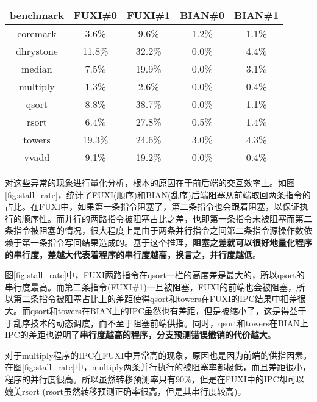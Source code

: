 \begin{table}[!htbp]
	\label{tab:stall_rate}
	\centering
	\footnotesize%
	\setlength{\tabcolsep}{4pt}%
	\renewcommand{\arraystretch}{1.2}%
	\begin{tabular}{ccccc}
		\hline
		benchmark   & FUXI\#0 & FUXI\#1 & BIAN\#0& BIAN\#1\\%
		\hline
		coremark    & 3.6\%  & 9.6\%  & 1.2\% & 1.1\% \\
		dhrystone   & 11.8\% & 32.2\% & 0.0\% & 4.4\% \\
		median 		& 7.5\%  & 19.9\% & 0.0\% & 3.1\% \\
		multiply 	& 1.3\%  & 2.6\%  & 0.0\% & 0.4\% \\
		qsort  		& 8.8\%  & 38.7\% & 0.0\% & 1.1\% \\
		rsort  		& 6.4\%  & 27.8\% & 0.5\% & 1.4\% \\
		towers 		& 19.3\% & 24.6\% & 3.0\% & 4.3\% \\
		vvadd 		& 9.1\%  & 19.2\% & 0.0\% & 0.4\% \\
		\hline
	\end{tabular}
\end{table}
	
对这些异常的现象进行量化分析，根本的原因在于前后端的交互效率上。如图\ref{fig:stall_rate}，统计了FUXI(顺序)和BIAN(乱序)后端阻塞从前端取回两条指令的占比。在FUXI中，如果第一条指令阻塞了，第二条指令也会跟着阻塞，以保证执行的顺序性。而并行的两路指令被阻塞占比之差，也即第一条指令未被阻塞而第二条指令被阻塞的情况，很大程度上是由于两条并行指令之间第二条指令源操作数依赖于第一条指令写回结果造成的。基于这个推理，\textbf{阻塞之差就可以很好地量化程序的串行度，差越大代表着程序的串行度越高，换言之，并行度越低}。

图\ref{fig:stall_rate}中，FUXI两路指令在qsort一栏的高度差是最大的，所以qsort的串行度最高。而第二条指令(FUXI\#1)一旦被阻塞，FUXI的前端也会被阻塞，所以第二条指令被阻塞占比上的差距使得qsort和towers在FUXI的IPC结果中相差很大。而qsort和towers在BIAN上的IPC虽然也有差距，但是被缩小了，这是得益于于乱序技术的动态调度，而不至于阻塞前端供指。同时，qsort和towers在BIAN上IPC的差距也说明了\textbf{串行度越高的程序，分支预测错误撤销的代价越大}。

对于multiply程序的IPC在FUXI中异常高的现象，原因也是因为前端的供指因素。在图\ref{fig:stall_rate}中，multiply两条并行执行的被阻塞率都极低，而且差距很小，程序的并行度很高。所以虽然转移预测率只有90\%，但是在FUXI中的IPC却可以媲美rsort (rsort虽然转移预测正确率很高，但是其串行度较高)。

